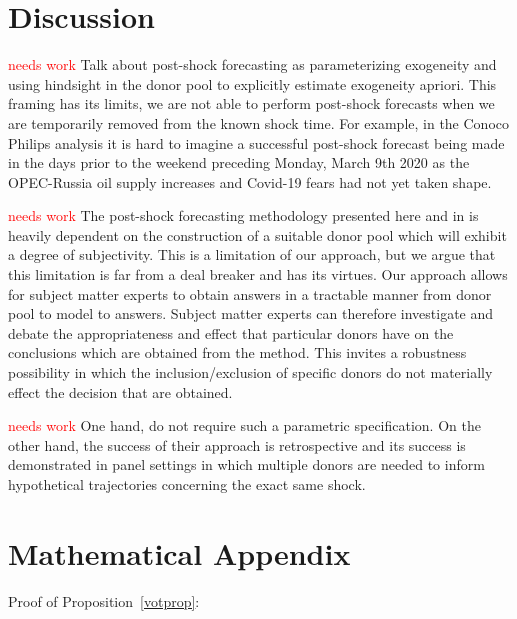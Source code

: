 \documentclass[11pt]{article}
\theoremstyle{definition}
\begin{document}
\section{Discussion}

\textcolor{red}{needs work} Talk about post-shock forecasting as parameterizing exogeneity and using hindsight in the donor pool to explicitly estimate exogeneity apriori. This framing has its limits, we are not able to perform post-shock forecasts when we are temporarily removed from the known shock time. For example, in the Conoco Philips analysis it is hard to imagine a successful post-shock forecast being made in the days prior to the weekend preceding Monday, March 9th 2020 as the OPEC-Russia oil supply increases and Covid-19 fears had not yet taken shape.

\textcolor{red}{needs work} The post-shock forecasting methodology presented here and in \cite{lin2021minimizing} is heavily dependent on the construction of a suitable donor pool which will exhibit a degree of subjectivity. This is a limitation of our approach, but we argue that this limitation is far from a deal breaker and has its virtues. Our approach allows for subject matter experts to obtain answers in a tractable manner from donor pool to model to answers. Subject matter experts can therefore investigate and debate the appropriateness and effect that particular donors have on the conclusions which are obtained from the method. This invites a robustness possibility in which the inclusion/exclusion of specific donors do not materially effect the decision that are obtained.

\textcolor{red}{needs work} One hand, \cite{agarwal2020two} do not require such a parametric specification. On the other hand, the success of their approach is retrospective and its success is demonstrated in panel settings in which multiple donors are needed to inform hypothetical trajectories concerning the exact same shock.





\section{Mathematical Appendix}


Proof of Proposition~\ref{votprop}:
\end{document}
